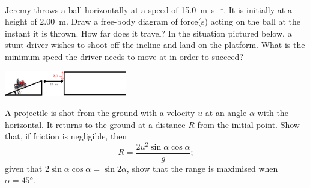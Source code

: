 \documentclass[a4paper]{exam}
\begin{document}
\begin{questions}
    \question Jeremy throws a ball horizontally at a speed of \SI{15.0}{\metre\per\second}. It is initially at a height of
              \SI{2.00}{\metre}. Draw a free-body diagram of force(s) acting on the ball at the instant it is thrown. How
              far does it travel?
    \question In the situation pictured below, a stunt driver wishes to shoot off the incline and land on the platform. What is
              the minimum speed the driver needs to move at in order to succeed?

              \includegraphics[width=0.4\textwidth]{motorcycle}

    \question A projectile is shot from the ground with a velocity $ u $ at an angle $ \alpha $ with the horizontal. It returns
              to the ground at a distance $ R $ from the initial point. Show that, if friction is negligible, then
              \begin{displaymath}
                R = \frac{2u^2 \sin \alpha \cos \alpha}{g};
              \end{displaymath}
              given that $ 2 \sin \alpha \cos \alpha = \sin 2\alpha $, show that the range is maximised when $ \alpha = \ang{45} $.
  \end{questions}
\end{document}
